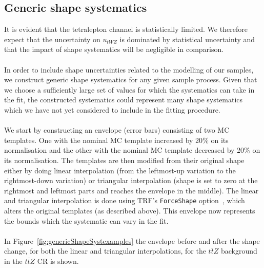 \subsection{Generic shape systematics}
\label{sec:genericShapeSyst}

It is evident that the tetralepton channel is statistically limited. We therefore expect that the uncertainty on $u_{tWZ}$ is dominated by statistical uncertainty and that the impact of shape systematics will be negligible in comparison.\\\\

In order to include shape uncertainties related to the modelling of our samples, we construct generic shape systematics for any given sample process. Given that we choose a sufficiently large set of values for which the systematics can take in the fit, the constructed systematics could represent many shape systematics which we have not yet considered to include in the fitting procedure.\\\\

We start by constructing an envelope (error bars) consisting of two MC templates. One with the nominal MC template increased by 20$\%$ on its normalisation and the other with the nominal MC template decreased by 20$\%$ on its normalisation. The templates are then modified from their original shape either by doing linear interpolation (from the leftmost-up variation to the rightmost-down variation) or triangular interpolation (shape is set to zero at the rightmost and leftmost parts and reaches the envelope in the middle). The linear and triangular interpolation is done using TRF's \texttt{ForceShape} option~\cite{TRF-ForceShape}, which alters the original templates (as described above). This envelope now represents the bounds which the systematic can vary in the fit.\\\\

In Figure~\ref{fig:genericShapeSystexamples} the envelope before and after the shape change, for both the linear and triangular interpolations, for the $t\bar{t}Z$ background in the $t\bar{t}Z$ CR is shown.

